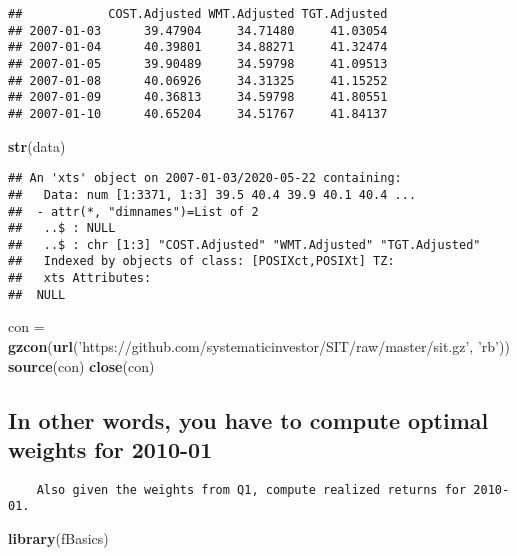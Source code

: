 \documentclass[]{article}
\newenvironment{Shaded}{\begin{snugshade}}{\end{snugshade}}
\newcommand{\KeywordTok}[1]{\textcolor[rgb]{0.13,0.29,0.53}{\textbf{#1}}}
\newcommand{\NormalTok}[1]{#1}
\newcommand{\StringTok}[1]{\textcolor[rgb]{0.31,0.60,0.02}{#1}}
\begin{document}
\begin{verbatim}
##            COST.Adjusted WMT.Adjusted TGT.Adjusted
## 2007-01-03      39.47904     34.71480     41.03054
## 2007-01-04      40.39801     34.88271     41.32474
## 2007-01-05      39.90489     34.59798     41.09513
## 2007-01-08      40.06926     34.31325     41.15252
## 2007-01-09      40.36813     34.59798     41.80551
## 2007-01-10      40.65204     34.51767     41.84137
\end{verbatim}

\begin{Shaded}
\begin{Highlighting}[]
\KeywordTok{str}\NormalTok{(data)}
\end{Highlighting}
\end{Shaded}

\begin{verbatim}
## An 'xts' object on 2007-01-03/2020-05-22 containing:
##   Data: num [1:3371, 1:3] 39.5 40.4 39.9 40.1 40.4 ...
##  - attr(*, "dimnames")=List of 2
##   ..$ : NULL
##   ..$ : chr [1:3] "COST.Adjusted" "WMT.Adjusted" "TGT.Adjusted"
##   Indexed by objects of class: [POSIXct,POSIXt] TZ: 
##   xts Attributes:  
##  NULL
\end{verbatim}

\begin{Shaded}
\begin{Highlighting}[]
\NormalTok{con =}\StringTok{ }\KeywordTok{gzcon}\NormalTok{(}\KeywordTok{url}\NormalTok{(}\StringTok{'https://github.com/systematicinvestor/SIT/raw/master/sit.gz'}\NormalTok{, }\StringTok{'rb'}\NormalTok{))}
\KeywordTok{source}\NormalTok{(con)}
\KeywordTok{close}\NormalTok{(con)}
\end{Highlighting}
\end{Shaded}

\hypertarget{in-other-words-you-have-to-compute-optimal-weights-for-2010-01}{%
\subsection{In other words, you have to compute optimal weights for
2010-01}\label{in-other-words-you-have-to-compute-optimal-weights-for-2010-01}}

\begin{verbatim}
    Also given the weights from Q1, compute realized returns for 2010-01.
\end{verbatim}

\begin{Shaded}
\begin{Highlighting}[]
\KeywordTok{library}\NormalTok{(fBasics)}
\end{Highlighting}
\end{Shaded}
\end{document}
